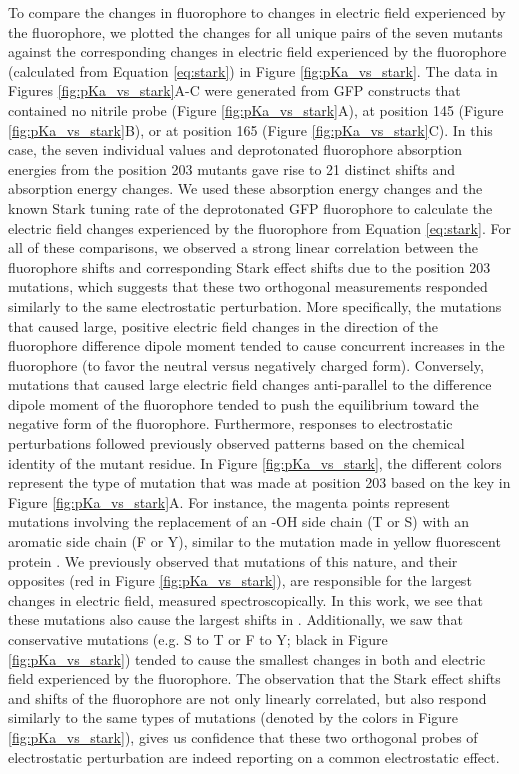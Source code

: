 To compare the changes in fluorophore \pKa{} to changes in electric field experienced by the fluorophore, we plotted the \pKa{} changes for all unique pairs of the seven mutants against the corresponding changes in electric field experienced by the fluorophore (calculated from Equation \ref{eq:stark}) in Figure \ref{fig:pKa_vs_stark}.
The data in Figures \ref{fig:pKa_vs_stark}A-C were generated from GFP constructs that contained no nitrile probe (Figure \ref{fig:pKa_vs_stark}A), \pCNF{} at position 145 (Figure \ref{fig:pKa_vs_stark}B), or \pCNF{} at position 165 (Figure \ref{fig:pKa_vs_stark}C).
In this case, the seven individual \pKa{} values and deprotonated fluorophore absorption energies from the position 203 mutants gave rise to 21 distinct \pKa{} shifts and absorption energy changes.
We used these absorption energy changes and the known Stark tuning rate of the deprotonated GFP fluorophore to calculate the electric field changes experienced by the fluorophore from Equation \ref{eq:stark}.
For all of these comparisons, we observed a strong linear correlation between the fluorophore \pKa{} shifts and corresponding Stark effect shifts due to the position 203 mutations, which suggests that these two orthogonal measurements responded similarly to the same electrostatic perturbation.
More specifically, the mutations that caused large, positive electric field changes in the direction of the fluorophore difference dipole moment tended to cause concurrent increases in the fluorophore \pKa{} (to favor the neutral versus negatively charged form).
Conversely, mutations that caused large electric field changes anti-parallel to the difference dipole moment of the fluorophore tended to push the equilibrium toward the negative form of the fluorophore.
Furthermore, responses to electrostatic perturbations followed previously observed patterns based on the chemical identity of the mutant residue.
In Figure \ref{fig:pKa_vs_stark}, the different colors represent the type of mutation that was made at position 203 based on the key in Figure \ref{fig:pKa_vs_stark}A.
For instance, the magenta points represent mutations involving the replacement of an -OH side chain (T or S) with an aromatic side chain (F or Y), similar to the mutation made in yellow fluorescent protein \cite{Wachter1998}.
We previously observed that mutations of this nature, and their opposites (red in Figure \ref{fig:pKa_vs_stark}), are responsible for the largest changes in electric field, measured spectroscopically.
In this work, we see that these mutations also cause the largest shifts in \pKa{}.
Additionally, we saw that conservative mutations (e.g. S to T or F to Y; black in Figure \ref{fig:pKa_vs_stark}) tended to cause the smallest changes in both \pKa{} and electric field experienced by the fluorophore.
The observation that the Stark effect shifts and \pKa{} shifts of the fluorophore are not only linearly correlated, but also respond similarly to the same types of mutations (denoted by the colors in Figure \ref{fig:pKa_vs_stark}), gives us confidence that these two orthogonal probes of electrostatic perturbation are indeed reporting on a common electrostatic effect.

